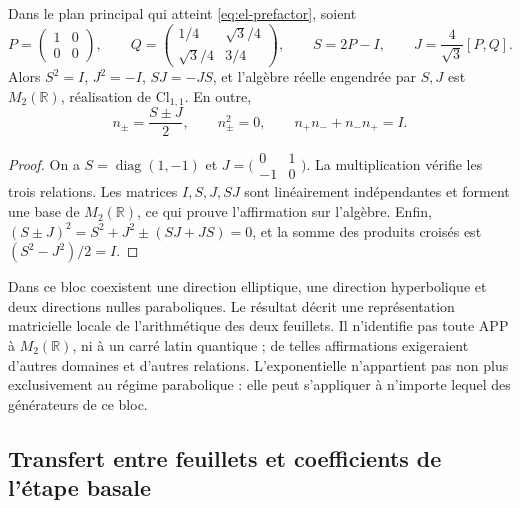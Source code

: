 \begin{proposition}
Dans le plan principal qui atteint \eqref{eq:el-prefactor}, soient
\[
 P=\begin{pmatrix}1&0\\0&0\end{pmatrix},\qquad
 Q=\begin{pmatrix}1/4&\sqrt3/4\\\sqrt3/4&3/4\end{pmatrix},\qquad
 S=2P-I,\qquad J=\frac4{\sqrt3}[P,Q].
\]
Alors \(S^2=I\), \(J^2=-I\), \(SJ=-JS\), et l'algèbre réelle engendrée par \(S,J\) est \(M_2(\mathbb R)\), réalisation de \(\mathrm{Cl}_{1,1}\). En outre,
\[
 n_\pm=\frac{S\pm J}{2},\qquad
 n_\pm^2=0,\qquad n_+n_-+n_-n_+=I.
\]
\end{proposition}
\begin{proof}
On a \(S=\operatorname{diag}(1,-1)\) et
\(J=\bigl(\begin{smallmatrix}0&1\\-1&0\end{smallmatrix}\bigr)\).
La multiplication vérifie les trois relations. Les matrices \(I,S,J,SJ\) sont linéairement indépendantes et forment une base de \(M_2(\mathbb R)\), ce qui prouve l'affirmation sur l'algèbre. Enfin, \((S\pm J)^2=S^2+J^2\pm(SJ+JS)=0\), et la somme des produits croisés est \((S^2-J^2)/2=I\).
\end{proof}

Dans ce bloc coexistent une direction elliptique, une direction hyperbolique et deux
directions nulles paraboliques. Le résultat décrit une représentation
matricielle locale de l'arithmétique des deux feuillets. Il n'identifie pas toute APP
à \(M_2(\mathbb R)\), ni à un carré latin quantique ; de telles
affirmations exigeraient d'autres domaines et d'autres relations. L'exponentielle
n'appartient pas non plus exclusivement au régime parabolique : elle peut
s'appliquer à n'importe lequel des générateurs de ce bloc.



\subsection{Transfert entre feuillets et coefficients de l'étape basale}

